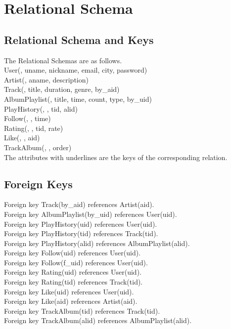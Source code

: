 \documentclass[letterpaper, 12pt]{report}
\begin{document}
	\section{Relational Schema}
	\subsection{Relational Schema and Keys}
	The Relational Schemas are as follows.\\
	User(\underline{}, uname, nickname, email, city, password)\\
	Artist(\underline{}, aname, description)\\
	Track(\underline{}, title, duration, genre, by\_aid)\\
	AlbumPlaylist(\underline{}, title, time, count, type, by\_uid)\\
	PlayHistory(\underline{}, \underline{}, tid, alid)\\
	Follow(\underline{}, \underline{}, time)\\
	Rating(\underline{}, \underline{}, tid, rate)\\
	Like(\underline{}, \underline{}, aid)\\
	TrackAlbum(\underline{}, \underline{}, order)\\
	The attributes with underlines are the keys of the corresponding relation.
	\subsection{Foreign Keys}
	Foreign key Track(by\_aid) references Artist(aid).\\
	Foreign key AlbumPlaylist(by\_uid) references User(uid).\\
	Foreign key PlayHistory(uid) references User(uid).\\
	Foreign key PlayHistory(tid) references Track(tid).\\
	Foreign key PlayHistory(alid) references AlbumPlaylist(alid).\\
	Foreign key Follow(uid) references User(uid).\\
	Foreign key Follow(f\_uid) references User(uid).\\
	Foreign key Rating(uid) references User(uid).\\
	Foreign key Rating(tid) references Track(tid).\\
	Foreign key Like(uid) references User(uid).\\
	Foreign key Like(aid) references Artist(aid).\\
	Foreign key TrackAlbum(tid) references Track(tid).\\
	Foreign key TrackAlbum(alid) references AlbumPlaylist(alid).\\
	
\end{document}

